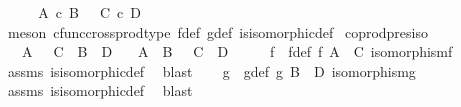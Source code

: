 \begin{isabellebody}
\ \ \isamarkupfalse%
\ \isamarkupfalse%
\ {\isachardoublequoteopen}A\ {\isasymtimes}\isactrlsub c\ B\ {\isasymcong}\ \ C\ {\isasymtimes}\isactrlsub c\ D{\isachardoublequoteclose}\isanewline
\ \ \ \ \isamarkupfalse%
\ {\isacharparenleft}{\kern0pt}meson\ cfunc{\isacharunderscore}{\kern0pt}cross{\isacharunderscore}{\kern0pt}prod{\isacharunderscore}{\kern0pt}type\ f{\isacharunderscore}{\kern0pt}def\ g{\isacharunderscore}{\kern0pt}def\ is{\isacharunderscore}{\kern0pt}isomorphic{\isacharunderscore}{\kern0pt}def{\isacharparenright}{\kern0pt}\isanewline
{}\isamarkupfalse%
%
\endisatagproof
{\isafoldproof}%
%
\isadelimproof
\isanewline
%
\endisadelimproof
\isanewline
{}\isamarkupfalse%
\ coprod{\isacharunderscore}{\kern0pt}pres{\isacharunderscore}{\kern0pt}iso{\isacharcolon}{\kern0pt}\isanewline
\ \ \ {\isachardoublequoteopen}A\ {\isasymcong}\ \ C{\isachardoublequoteclose}\ \ {\isachardoublequoteopen}B\ {\isasymcong}\ D{\isachardoublequoteclose}\isanewline
\ \ \ {\isachardoublequoteopen}A\ {\isasymCoprod}\ B\ {\isasymcong}\ \ C\ {\isasymCoprod}\ D{\isachardoublequoteclose}\isanewline
%
\isadelimproof
%
\endisadelimproof
%
\isatagproof
{}\isamarkupfalse%
{\isacharminus}{\kern0pt}\ \isanewline
\ \ \isamarkupfalse%
\ f\ \ f{\isacharunderscore}{\kern0pt}def{\isacharcolon}{\kern0pt}\ {\isachardoublequoteopen}f{\isacharcolon}{\kern0pt}\ A\ {\isasymrightarrow}\ C{\isachardoublequoteclose}\ {\isachardoublequoteopen}isomorphism{\isacharparenleft}{\kern0pt}f{\isacharparenright}{\kern0pt}{\isachardoublequoteclose}\isanewline
\ \ \ \ \isamarkupfalse%
\ assms{\isacharparenleft}{\kern0pt}{}{\isacharparenright}{\kern0pt}\ is{\isacharunderscore}{\kern0pt}isomorphic{\isacharunderscore}{\kern0pt}def\ \isamarkupfalse%
\ blast\isanewline
\ \ \isamarkupfalse%
\ g\ \ g{\isacharunderscore}{\kern0pt}def{\isacharcolon}{\kern0pt}\ {\isachardoublequoteopen}g{\isacharcolon}{\kern0pt}\ B\ {\isasymrightarrow}\ D{\isachardoublequoteclose}\ {\isachardoublequoteopen}isomorphism{\isacharparenleft}{\kern0pt}g{\isacharparenright}{\kern0pt}{\isachardoublequoteclose}\isanewline
\ \ \ \ \isamarkupfalse%
\ assms{\isacharparenleft}{\kern0pt}{}{\isacharparenright}{\kern0pt}\ is{\isacharunderscore}{\kern0pt}isomorphic{\isacharunderscore}{\kern0pt}def\ \isamarkupfalse%
\ blast\isanewline
\isanewline
\ \ \isamarkupfalse%

\end{isabellebody}
